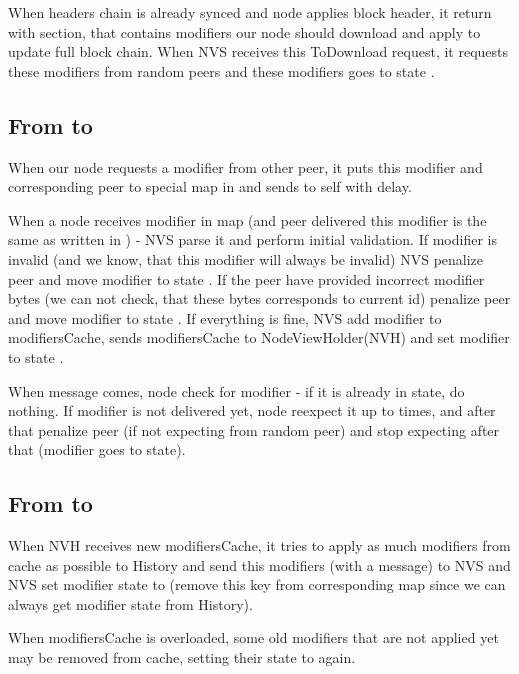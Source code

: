 When headers chain is already synced and node applies block header, it return  with  section,
that contains modifiers our node should download and apply to update full block chain.
When NVS receives this ToDownload request, it requests these modifiers from random peers
and these modifiers goes to state .

\subsection{From  to }

When our node requests a modifier from other peer, it puts this modifier and
corresponding peer to special map  in  and sends  to self
with  delay.

When a node receives modifier in  map
(and peer delivered this modifier is the same as written in ) -
NVS parse it and perform initial validation.
If modifier is invalid (and we know, that this modifier will always be invalid) NVS penalize peer and move modifier to state .
If the peer have provided incorrect modifier bytes (we can not check,
that these bytes corresponds to current id) penalize peer and move modifier to state .
If everything is fine, NVS add modifier to modifiersCache, sends modifiersCache to
NodeViewHolder(NVH) and set modifier to state .

When  message comes, node check for modifier - if it is already in  state,
do nothing.
If modifier is not delivered yet, node reexpect it up to  times, and after that
penalize peer (if not expecting from random peer) and stop expecting after that (modifier goes to  state).

\subsection{From  to }

When NVH receives new modifiersCache, it tries to apply as much modifiers from cache as possible to History
and send this modifiers (with a  message) to NVS and NVS set modifier
state to  (remove this key from corresponding map since we can always get modifier state from History).

When modifiersCache is overloaded, some old modifiers that are not applied yet may be removed from cache, setting
their state to  again.